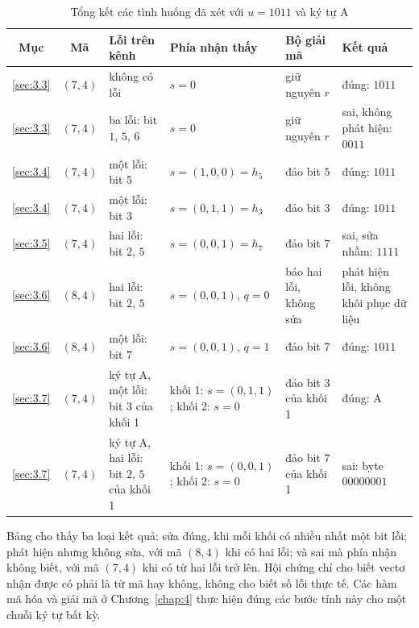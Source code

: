 \begin{table}[H]
\centering\small\renewcommand{\arraystretch}{1.1}
\setlength{\tabcolsep}{4pt}
\caption{Tổng kết các tình huống đã xét với $u = 1011$ và ký tự A}
\label{tab:tongket}
\begin{tabular}{|c|c|>{\raggedright\arraybackslash}p{3.2cm}|>{\raggedright\arraybackslash}p{3.3cm}|>{\raggedright\arraybackslash}p{3.0cm}|>{\raggedright\arraybackslash}p{3.5cm}|}
\hline
\textbf{Mục} & \textbf{Mã} & \textbf{Lỗi trên kênh} & \textbf{Phía nhận thấy} &
\textbf{Bộ giải mã} & \textbf{Kết quả}\\ \hline
\ref{sec:3.3} & $(7,4)$ & không có lỗi & $s = 0$ & giữ nguyên $r$ & đúng: $1011$\\ \hline
\ref{sec:3.3} & $(7,4)$ & ba lỗi: bit $1$, $5$, $6$ & $s = 0$ & giữ nguyên $r$ & sai, không phát hiện: $0011$\\ \hline
\ref{sec:3.4} & $(7,4)$ & một lỗi: bit $5$ & $s = (1,0,0) = h_5$ & đảo bit $5$ & đúng: $1011$\\ \hline
\ref{sec:3.4} & $(7,4)$ & một lỗi: bit $3$ & $s = (0,1,1) = h_3$ & đảo bit $3$ & đúng: $1011$\\ \hline
\ref{sec:3.5} & $(7,4)$ & hai lỗi: bit $2$, $5$ & $s = (0,0,1) = h_7$ & đảo bit $7$ & sai, sửa nhầm: $1111$\\ \hline
\ref{sec:3.6} & $(8,4)$ & hai lỗi: bit $2$, $5$ & $s = (0,0,1)$, $q = 0$ & báo hai lỗi, không sửa & phát hiện lỗi, không khôi phục dữ liệu\\ \hline
\ref{sec:3.6} & $(8,4)$ & một lỗi: bit $7$ & $s = (0,0,1)$, $q = 1$ & đảo bit $7$ & đúng: $1011$\\ \hline
\ref{sec:3.7} & $(7,4)$ & ký tự A, một lỗi: bit $3$ của khối 1 & khối 1: $s = (0,1,1)$; khối 2: $s = 0$ & đảo bit $3$ của khối 1 & đúng: A\\ \hline
\ref{sec:3.7} & $(7,4)$ & ký tự A, hai lỗi: bit $2$, $5$ của khối 1 & khối 1: $s = (0,0,1)$; khối 2: $s = 0$ & đảo bit $7$ của khối 1 & sai: byte $00000001$\\ \hline
\end{tabular}
\end{table}

Bảng cho thấy ba loại kết quả: sửa đúng, khi mỗi khối có nhiều nhất một bit
lỗi; phát hiện nhưng không sửa, với mã $(8,4)$ khi có hai lỗi; và sai mà phía
nhận không biết, với mã $(7,4)$ khi có từ hai lỗi trở lên. Hội chứng chỉ cho
biết vectơ nhận được có phải là từ mã hay không, không cho biết số lỗi thực tế.
Các hàm mã hóa và giải mã ở Chương~\ref{chap:4} thực hiện đúng các bước tính
này cho một chuỗi ký tự bất kỳ.

